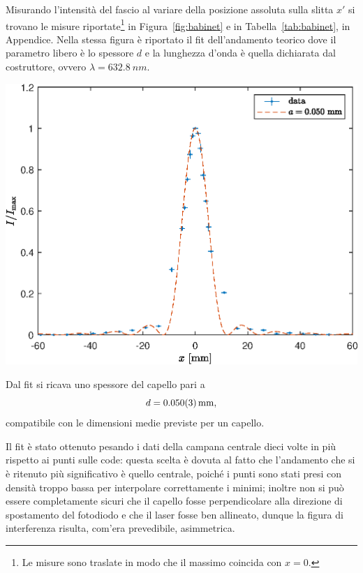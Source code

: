 \documentclass[10pt,oneside,a4paper]{article}
\newenvironment{Figure}
  {\par\medskip\noindent\minipage{\linewidth}}
  {\endminipage\par\medskip}
\begin{document}
\begin{multicols}{2}
Misurando l'intensità del fascio al variare della posizione assoluta sulla slitta $x'$ si trovano le misure riportate\footnote{Le misure sono traslate in modo che il massimo coincida con $x=0$.} in Figura~\ref{fig:babinet} e in Tabella~\ref{tab:babinet}, in Appendice. Nella stessa figura è riportato il fit dell'andamento teorico dove il parametro libero è lo spessore $d$ e la lunghezza d'onda è quella dichiarata dal costruttore, ovvero $\lambda = \SI{632.8}{nm}$.
\begin{Figure}
	\begin{center}
	\includegraphics[width=\linewidth]{babinet.eps}
	\label{fig:babinet}
	\end{center}
\end{Figure}

Dal fit si ricava uno spessore del capello pari a 
\[
	d = \SI{0.050 \pm 0.003}{mm},
\]
compatibile con le dimensioni medie previste per un capello.

Il fit è stato ottenuto pesando i dati della campana centrale dieci volte in più rispetto ai punti sulle code: questa scelta è dovuta al fatto che l'andamento che si è ritenuto più significativo è quello centrale, poiché i punti sono stati presi con densità troppo bassa per interpolare correttamente i minimi; inoltre non si può essere completamente sicuri che il capello fosse perpendicolare alla direzione di spostamento del fotodiodo e che il laser fosse ben allineato, dunque la figura di interferenza risulta, com'era prevedibile, asimmetrica. 


\end{multicols}
\end{document}
